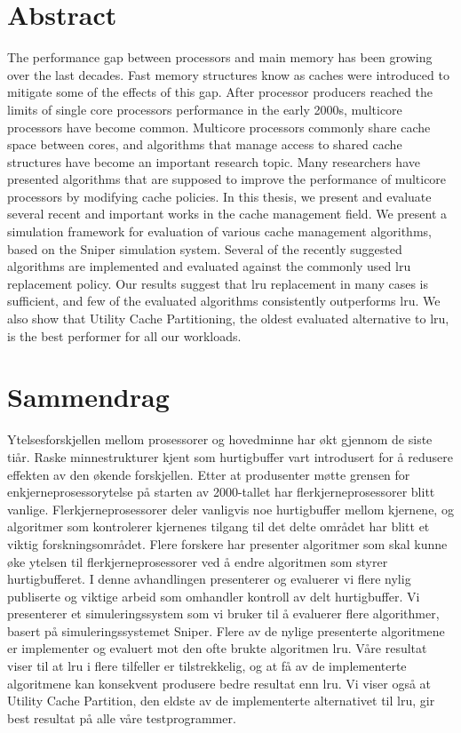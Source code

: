 
\section*{Abstract}

The performance gap between processors and main memory has been growing over the last decades.
Fast memory structures know as caches were introduced to mitigate some of the effects of this gap.
After processor producers reached the limits of single core processors performance in the early 2000s, multicore processors have become common.
Multicore processors commonly share cache space between cores, and algorithms that manage access to shared cache structures have become an important research topic.
Many researchers have presented algorithms that are supposed to improve the performance of multicore processors by modifying cache policies.
In this thesis, we present and evaluate several recent and important works in the cache management field.
We present a simulation framework for evaluation of various cache management algorithms, based on the Sniper simulation system.
Several of the recently suggested algorithms are implemented and evaluated against the commonly used \gls{lru} replacement policy.
Our results suggest that \gls{lru} replacement in many cases is sufficient, and few of the evaluated algorithms consistently outperforms \gls{lru}.
We also show that Utility Cache Partitioning, the oldest evaluated alternative to \gls{lru}, is the best performer for all our workloads.

\glsresetall
\clearpage

\section*{Sammendrag}
Ytelsesforskjellen mellom prosessorer og hovedminne har økt gjennom de siste tiår.
Raske minnestrukturer kjent som hurtigbuffer vart introdusert for å redusere effekten av den økende forskjellen.
Etter at produsenter møtte grensen for enkjerneprosessorytelse på starten av 2000-tallet har flerkjerneprosessorer blitt vanlige.
Flerkjerneprosessorer deler vanligvis noe hurtigbuffer mellom kjernene, og algoritmer som kontrolerer kjernenes tilgang til det delte området har blitt et viktig forskningsområdet.
Flere forskere har presenter algoritmer som skal kunne øke ytelsen til flerkjerneprosessorer ved å endre algoritmen som styrer hurtigbufferet.
I denne avhandlingen presenterer og evaluerer vi flere nylig publiserte og viktige arbeid som omhandler kontroll av delt hurtigbuffer.
Vi presenterer et simuleringssystem som vi bruker til å evaluerer flere algorithmer, basert på simuleringssystemet Sniper.
Flere av de nylige presenterte algoritmene er implementer og evaluert mot den ofte brukte algoritmen \gls{lru}.
Våre resultat viser til at \gls{lru} i flere tilfeller er tilstrekkelig, og at få av de implementerte algoritmene kan konsekvent produsere bedre resultat enn \gls{lru}.
Vi viser også at Utility Cache Partition, den eldste av de implementerte alternativet til \gls{lru}, gir best resultat på alle våre testprogrammer.

\clearpage
